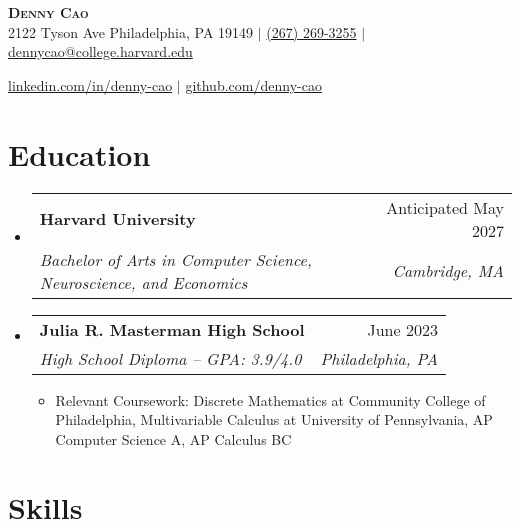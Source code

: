 \documentclass[letterpaper,11pt]{article}
\makeatletter
\newcommand{\resumeItem}[1]{
  \item\small{
    {#1 \vspace{-2pt}}
  }
}
\newcommand{\resumeSubheading}[4]{
  \vspace{-2pt}\item
    \begin{tabular*}{0.97\textwidth}[t]{l@{\extracolsep{\fill}}r}
      \textbf{#1} & #2 \\
      \small#3 & \small #4   \\
    \end{tabular*}\vspace{-7pt}
}
\newcommand{\resumeSubHeadingListStart}{\begin{itemize}[leftmargin=0.15in, label={}]}
\newcommand{\resumeSubHeadingListEnd}{\end{itemize}}
\newcommand{\resumeItemListStart}{\begin{itemize}}
\newcommand{\resumeItemListEnd}{\end{itemize}\vspace{-5pt}}
\makeatother
\begin{document}


\textbf{\Huge \scshape Denny Cao} \\ \vspace{1pt}
\small 2122 Tyson Ave Philadelphia, PA 19149 $|$ \href{tel:12672693255}{(267) 269-3255} $|$ \href{mailto:dennycao@college.harvard.edu}{dennycao@college.harvard.edu} 

\href{https://www.linkedin.com/in/denny-cao/}{linkedin.com/in/denny-cao} $|$     \href{https://github.com/denny-cao}{github.com/denny-cao}


\section{Education}
  \resumeSubHeadingListStart
    \resumeSubheading
      {Harvard University}{Anticipated May 2027}
      {\textit{Bachelor of Arts in Computer Science, Neuroscience, and Economics}}{\textit{Cambridge, MA}}
    \resumeSubheading
      {Julia R. Masterman High School}{June 2023}
      {\textit{High School Diploma -- GPA: 3.9/4.0}}{\textit{Philadelphia, PA}}
      \resumeItemListStart
        \resumeItem{Relevant Coursework: Discrete Mathematics at Community College of Philadelphia, Multivariable Calculus at University of Pennsylvania, AP Computer Science A, AP Calculus BC}
      \resumeItemListEnd
  \resumeSubHeadingListEnd



\section{Skills}
\end{document}
